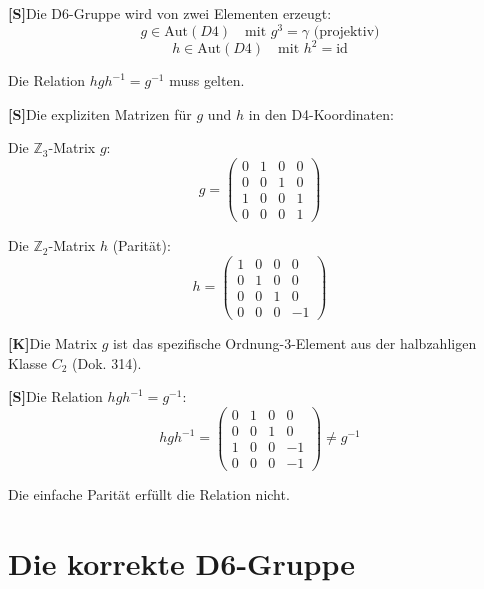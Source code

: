 \documentclass[11pt,a4paper]{article}
\newcommand{\Kstatus}{\textbf{[K]}}
\newcommand{\Sstatus}{\textbf{[S]}}
\begin{document}
	\Sstatus Die D6-Gruppe wird von zwei Elementen erzeugt:
	\begin{equation}
		g \in \text{Aut}(D4) \quad \text{mit } g^3 = \gamma \text{ (projektiv)}
	\end{equation}
	\begin{equation}
		h \in \text{Aut}(D4) \quad \text{mit } h^2 = \text{id}
	\end{equation}
	
	Die Relation $h g h^{-1} = g^{-1}$ muss gelten.
	
	\Sstatus Die expliziten Matrizen für $g$ und $h$ in den D4-Koordinaten:
	
	Die $\mathbb{Z}_3$-Matrix $g$:
	\begin{equation}
		g = \begin{pmatrix}
			0 & 1 & 0 & 0 \\
			0 & 0 & 1 & 0 \\
			1 & 0 & 0 & 1 \\
			0 & 0 & 0 & 1
		\end{pmatrix}
	\end{equation}
	
	Die $\mathbb{Z}_2$-Matrix $h$ (Parität):
	\begin{equation}
		h = \begin{pmatrix}
			1 & 0 & 0 & 0 \\
			0 & 1 & 0 & 0 \\
			0 & 0 & 1 & 0 \\
			0 & 0 & 0 & -1
		\end{pmatrix}
	\end{equation}
	
	\Kstatus Die Matrix $g$ ist das spezifische Ordnung-3-Element aus der halbzahligen Klasse $C_2$ (Dok. 314).
	
	\Sstatus Die Relation $h g h^{-1} = g^{-1}$:
	\begin{equation}
		h g h^{-1} = \begin{pmatrix}
			0 & 1 & 0 & 0 \\
			0 & 0 & 1 & 0 \\
			1 & 0 & 0 & -1 \\
			0 & 0 & 0 & -1
		\end{pmatrix} \neq g^{-1}
	\end{equation}
	
	Die einfache Parität erfüllt die Relation nicht.
	
	\section{Die korrekte D6-Gruppe}
	
\end{document}
